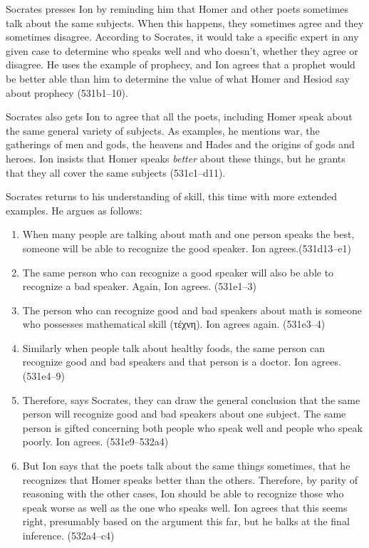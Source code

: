 \documentclass[11pt]{article}
\begin{document}
Socrates presses Ion by reminding him that Homer and other poets sometimes
talk about the same subjects.  When this happens, they sometimes agree and
they sometimes disagree.  According to Socrates, it would take a specific
expert in any given case to determine who speaks well and who doesn't,
whether they agree or disagree.  He uses the example of prophecy, and Ion
agrees that a prophet would be better able than him to determine the value
of what Homer and Hesiod say about prophecy (531b1--10).

Socrates also gets Ion to agree that all the poets, including Homer speak
about the same general variety of subjects.  As examples, he mentions war,
the gatherings of men and gods, the heavens and Hades and the origins of
gods and heroes.  Ion insists that Homer speaks \emph{better} about these
things, but he grants that they all cover the same subjects (531c1--d11).

Socrates returns to his understanding of skill, this time with more
extended examples.  He argues as follows:

\begin{enumerate}

    \item When many people are talking about math and one person speaks the
        best, someone will be able to recognize the good speaker.  Ion
        agrees.(531d13--e1)

    \item The same person who can recognize a good speaker will also be
        able to recognize a bad speaker.  Again, Ion agrees. (531e1--3)

    \item The person who can recognize good and bad speakers about math is
        someone who possesses mathematical skill ({\g τέχνη}).  Ion agrees
        again. (531e3--4)

    \item Similarly when people talk about healthy foods, the same person
        can recognize good and bad speakers and that person is a doctor.
        Ion agrees. (531e4--9)

    \item Therefore, says Socrates, they can draw the general conclusion
        that the same person will recognize good and bad speakers about one
        subject.  The same person is gifted concerning both people who
        speak well and people who speak poorly.  Ion agrees. (531e9--532a4)

    \item But Ion says that the poets talk about the same things sometimes,
        that he recognizes that Homer speaks better than the others.
        Therefore, by parity of reasoning with the other cases, Ion should
        be able to recognize those who speak worse as well as the one who
        speaks well.  Ion agrees that this seems right, presumably based on
        the argument this far, but he balks at the final inference.
        (532a4--c4)

\end{enumerate}
\end{document}
